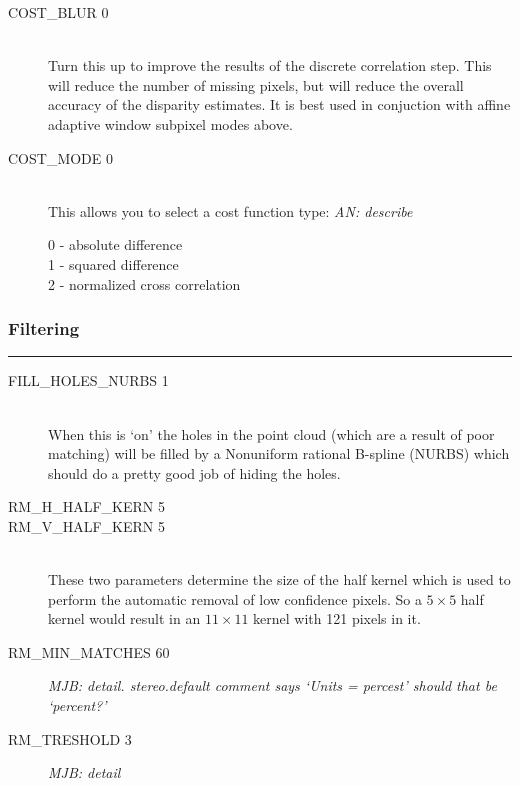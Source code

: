 \begin{description}
\item[COST\_BLUR 0] \hfill \\
Turn this up to improve the results of the discrete
correlation step.  This will reduce the number of 
missing pixels, but will reduce the overall accuracy of 
the disparity estimates.  It is best used in conjuction with 
affine adaptive window subpixel modes above.

\item[COST\_MODE 0] \hfill \\
This allows you to select a cost function type:
\emph{AN: describe}
	\begin{description}
	\item[0 - absolute difference]
	\item[1 - squared difference]
	\item[2 - normalized cross correlation]
	\end{description}

\end{description}

\subsubsection*{Filtering}
\hrule
\bigskip

\begin{description}

\item[FILL\_HOLES\_NURBS 1] \hfill \\
When this is `on' the holes in the point cloud (which are a result of poor matching) will be filled by a Nonuniform rational B-spline (NURBS) which should do a pretty good job of hiding the holes.

\item[RM\_H\_HALF\_KERN 5]
\item[RM\_V\_HALF\_KERN 5] \hfill \\
These two parameters determine the size of the half kernel which
is used to perform the automatic removal of low confidence pixels.
So a $5 \times 5$ half kernel would result in an $11 \times 11$
kernel with 121 pixels in it.

\item[RM\_MIN\_MATCHES 60]
\emph{MJB: detail.  stereo.default comment says `Units = percest'  should that be `percent?'}

\item[RM\_TRESHOLD 3]
\emph{MJB: detail}

\end{description}


